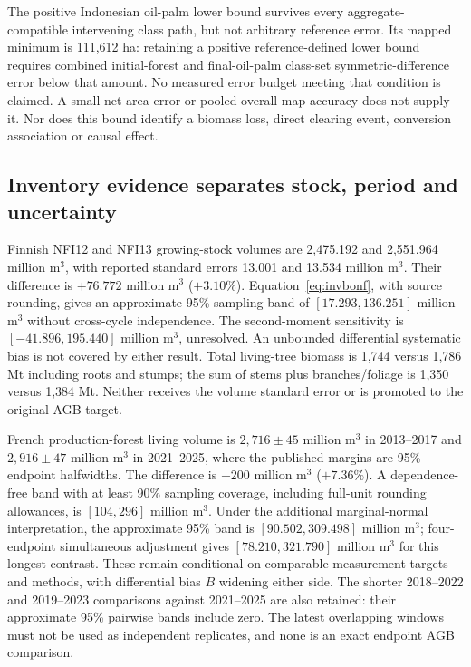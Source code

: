 The positive Indonesian oil-palm lower bound survives every aggregate-compatible intervening class path, but not arbitrary reference error. Its mapped minimum is 111,612 ha: retaining a positive reference-defined lower bound requires combined initial-forest and final-oil-palm class-set symmetric-difference error below that amount. No measured error budget meeting that condition is claimed. A small net-area error or pooled overall map accuracy does not supply it. Nor does this bound identify a biomass loss, direct clearing event, conversion association or causal effect.

\subsection{Inventory evidence separates stock, period and uncertainty}\label{sec:inventoryresults}
Finnish NFI12 and NFI13 growing-stock volumes are 2,475.192 and 2,551.964 million m$^3$, with reported standard errors 13.001 and 13.534 million m$^3$. Their difference is $+76.772$ million m$^3$ ($+3.10\%$). Equation~\ref{eq:invbonf}, with source rounding, gives an approximate 95\% sampling band of $[17.293,136.251]$ million m$^3$ without cross-cycle independence. The second-moment sensitivity is $[-41.896,195.440]$ million m$^3$, unresolved. An unbounded differential systematic bias is not covered by either result. Total living-tree biomass is 1,744 versus 1,786 Mt including roots and stumps; the sum of stems plus branches/foliage is 1,350 versus 1,384 Mt. Neither receives the volume standard error or is promoted to the original AGB target.

French production-forest living volume is $2,716\pm45$ million m$^3$ in 2013--2017 and $2,916\pm47$ million m$^3$ in 2021--2025, where the published margins are 95\% endpoint halfwidths. The difference is $+200$ million m$^3$ ($+7.36\%$). A dependence-free band with at least 90\% sampling coverage, including full-unit rounding allowances, is $[104,296]$ million m$^3$. Under the additional marginal-normal interpretation, the approximate 95\% band is $[90.502,309.498]$ million m$^3$; four-endpoint simultaneous adjustment gives $[78.210,321.790]$ million m$^3$ for this longest contrast. These remain conditional on comparable measurement targets and methods, with differential bias $B$ widening either side. The shorter 2018--2022 and 2019--2023 comparisons against 2021--2025 are also retained: their approximate 95\% pairwise bands include zero. The latest overlapping windows must not be used as independent replicates, and none is an exact endpoint AGB comparison.

